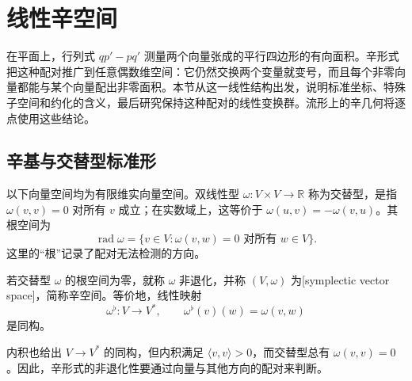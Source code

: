
% 
% 

\section{线性辛空间}
\label{g4:sec:0701}

在平面上，行列式 \(qp'-pq'\) 测量两个向量张成的平行四边形的有向面积。辛形式把这种配对推广到任意偶数维空间：它仍然交换两个变量就变号，而且每个非零向量都能与某个向量配出非零面积。本节从这一线性结构出发，说明标准坐标、特殊子空间和约化的含义，最后研究保持这种配对的线性变换群。流形上的辛几何将逐点使用这些结论。

\subsection{辛基与交替型标准形}
\label{g4:subsec:0701:01}

以下向量空间均为有限维实向量空间。双线性型 \(\omega:V\times V\to\mathbb R\) 称为交替型，是指 \(\omega(v,v)=0\) 对所有 \(v\) 成立；在实数域上，这等价于 \(\omega(u,v)=-\omega(v,u)\)。其根空间为
\[
	\operatorname{rad}\omega=\{v\in V:\omega(v,w)=0\text{ 对所有 }w\in V\}.
\]
这里的“根”记录了配对无法检测的方向。

\begin{definition}\label{g4:def:0701:symplectic-space}
	若交替型 \(\omega\) 的根空间为零，就称 \(\omega\) 非退化，并称 \((V,\omega)\) 为[symplectic vector space]，简称辛空间。等价地，线性映射
	\[
		\omega^\flat:V\longrightarrow V^*,\qquad
		\omega^\flat(v)(w)=\omega(v,w)
	\]
	是同构。
\end{definition}

内积也给出 \(V\to V^*\) 的同构，但内积满足 \(\langle v,v\rangle>0\)，而交替型总有 \(\omega(v,v)=0\)。因此，辛形式的非退化性要通过向量与其他方向的配对来判断。

